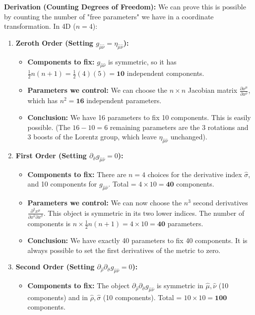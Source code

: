 \documentclass[11pt, a4paper]{report}
\begin{document}
\textbf{Derivation (Counting Degrees of Freedom):}
We can prove this is possible by counting the number of "free parameters" we have in a coordinate transformation. In 4D ($n=4$):
\begin{enumerate}
    \item \textbf{Zeroth Order (Setting $g_{\hat{\mu}\hat{\nu}} = \eta_{\hat{\mu}\hat{\nu}}$):}
    \begin{itemize}
        \item \textbf{Components to fix:} $g_{\hat{\mu}\hat{\nu}}$ is symmetric, so it has $\frac{1}{2}n(n+1) = \frac{1}{2}(4)(5) = \textbf{10}$ independent components.
        \item \textbf{Parameters we control:} We can choose the $n \times n$ Jacobian matrix $\frac{\partial x^\mu}{\partial x^{\hat{\nu}}}$, which has $n^2 = \textbf{16}$ independent parameters.
        \item \textbf{Conclusion:} We have 16 parameters to fix 10 components. This is easily possible. (The $16 - 10 = 6$ remaining parameters are the 3 rotations and 3 boosts of the Lorentz group, which leave $\eta_{\hat{\mu}\hat{\nu}}$ unchanged).
    \end{itemize}
    \item \textbf{First Order (Setting $\partial_{\hat{\sigma}} g_{\hat{\mu}\hat{\nu}} = 0$):}
    \begin{itemize}
        \item \textbf{Components to fix:} There are $n=4$ choices for the derivative index $\hat{\sigma}$, and 10 components for $g_{\hat{\mu}\hat{\nu}}$. Total = $4 \times 10 = \textbf{40}$ components.
        \item \textbf{Parameters we control:} We can now choose the $n^3$ second derivatives $\frac{\partial^2 x^\mu}{\partial x^{\hat{\nu}} \partial x^{\hat{\sigma}}}$. This object is symmetric in its two lower indices. The number of components is $n \times \frac{1}{2}n(n+1) = 4 \times 10 = \textbf{40}$ parameters.
        \item \textbf{Conclusion:} We have exactly 40 parameters to fix 40 components. It is always possible to set the first derivatives of the metric to zero.
    \end{itemize}
    \item \textbf{Second Order (Setting $\partial_{\hat{\rho}}\partial_{\hat{\sigma}} g_{\hat{\mu}\hat{\nu}} = 0$):}
    \begin{itemize}
        \item \textbf{Components to fix:} The object $\partial_{\hat{\rho}}\partial_{\hat{\sigma}} g_{\hat{\mu}\hat{\nu}}$ is symmetric in $\hat{\mu},\hat{\nu}$ (10 components) and in $\hat{\rho},\hat{\sigma}$ (10 components). Total = $10 \times 10 = \textbf{100}$ components.

\end{itemize}
\end{enumerate}
\end{document}
